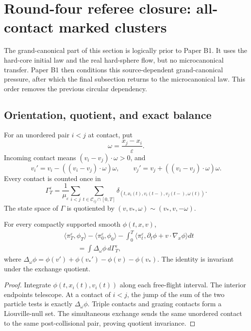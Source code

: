 \section{Round-four referee closure: all-contact marked clusters}
\label{sec:r3-b2}

The grand-canonical part of this section is logically prior to Paper B1.  It
uses the hard-core initial law and the real hard-sphere flow, but no
microcanonical transfer.  Paper B1 then conditions this source-dependent
grand-canonical pressure, after which the final subsection returns to the
microcanonical law.  This order removes the previous circular dependency.

\subsection{Orientation, quotient, and exact balance}

For an unordered pair \(i<j\) at contact, put
\[
 \omega=\frac{x_j-x_i}{\varepsilon}.
\]
Incoming contact means
\((v_i-v_j)\cdot\omega>0\), and
\[
 v_i'=v_i-((v_i-v_j)\cdot\omega)\omega,
 \qquad
 v_j'=v_j+((v_i-v_j)\cdot\omega)\omega.
\]
Every contact is counted once in
\[
 \Gamma_T^\varepsilon
 =\frac1{\mu_\varepsilon}
 \sum_{i<j}\sum_{t\in\mathcal C_{ij}\cap[0,T]}
 \delta_{(t,x_i(t),v_i(t-),v_j(t-),\omega(t))}.
\]
The state space of \(\Gamma\) is quotiented by
\((v,v_*,\omega)\sim(v_*,v,-\omega)\).

\begin{proposition}
\label{prop:r3-b2-balance}
For every compactly supported smooth \(\phi(t,x,v)\),
\[
 \begin{aligned}
 &\langle\pi_T^\varepsilon,\phi_T\rangle
 -\langle\pi_0^\varepsilon,\phi_0\rangle
 -\int_0^T\langle\pi_t^\varepsilon,
 \partial_t\phi+v\cdot\nabla_x\phi\rangle dt\\
 &\qquad=\int\Delta_\omega\phi\,d\Gamma_T^\varepsilon,
 \end{aligned}
\]
where
\(\Delta_\omega\phi=\phi(v')+\phi(v_*')-\phi(v)-\phi(v_*)\).
The identity is invariant under the exchange quotient.
\end{proposition}

\begin{proof}
Integrate \(\phi(t,x_i(t),v_i(t))\) along each free-flight interval.  The
interior endpoints telescope.  At a contact of \(i<j\), the jump of the sum of
the two particle tests is exactly \(\Delta_\omega\phi\).  Triple contacts and
grazing contacts form a Liouville-null set.  The simultaneous exchange sends
the same unordered contact to the same post-collisional pair, proving quotient
invariance.
\end{proof}

